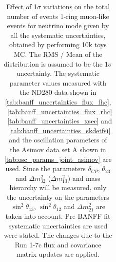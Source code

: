 \begin{table}[htb]
\begin{tabular}{| c | c | c |}
\end{tabular}
\caption{
 Effect of 1$\sigma$ variations on the total number of events 1-ring muon-like events for neutrino mode
 given by all the systematic uncertainties, obtained by performing 10k toys MC.
The RMS / Mean of the distribution is assumed to be the $1\sigma$ uncertainty.
The systematic parameter values measured with the ND280 data 
shown in 
\cref{tab:banff_uncertainties_flux_fhc},
~\ref{tab:banff_uncertainties_flux_rhc}
~\ref{tab:banff_uncertainties_xsec}
and
~\ref{tab:banff_uncertainties_skdetfsi}
and the oscillation parameters of the Asimov data set A shown in \cref{tab:osc_params_joint_asimov}
are used.
Since the parameters $\delta_{CP}$, $\theta_{23}$ and $\Delta m^2_{32}$ ($\Delta m^2_{13}$) and mass hierarchy
will be measured,
only the uncertainty on the parameters 
$\sin^2 \theta_{13}$,
$\sin^2 \theta_{12}$
and 
$\Delta m^2_{21}$ 
are taken into account.
Pre-BANFF fit systematic uncertainties are used were stated.
The changes due to the Run 1-7c flux and covariance matrix updates are applied.
}                                                                                                                                                                                          
\label{tab:nsk_systematic_table_summary_joint_asimov_A_fhc_mulike_Run17c}
\end{table}






